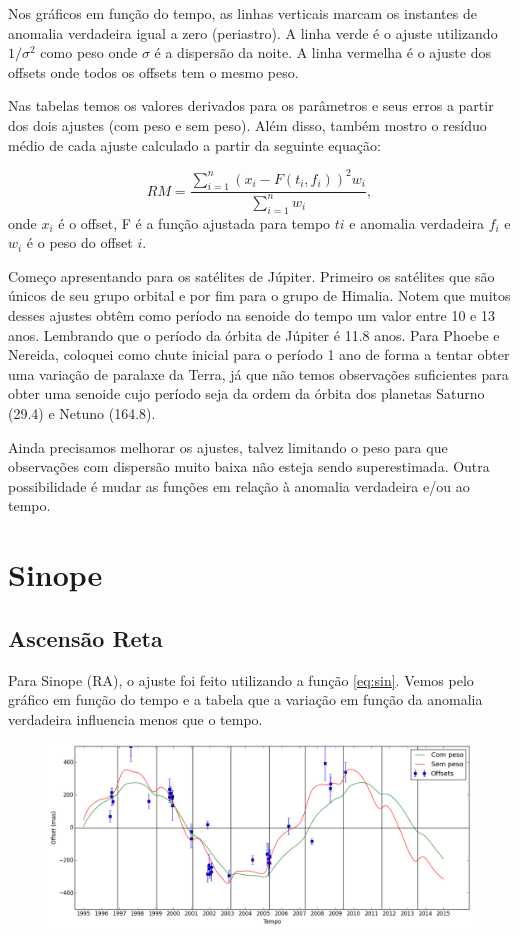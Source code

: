 \documentclass[11pt,a4paper]{report}
\begin{document}
Nos gráficos em função do tempo, as linhas verticais marcam os instantes de anomalia verdadeira igual a zero (periastro). A linha verde é o ajuste utilizando $1 / \sigma^{2}$ como peso onde $\sigma$ é a dispersão da noite. A linha vermelha é o ajuste dos offsets onde todos os offsets tem o mesmo peso.

Nas tabelas temos os valores derivados para os parâmetros e seus erros a partir dos dois ajustes (com peso e sem peso). Além disso, também mostro o resíduo médio de cada ajuste calculado a partir da seguinte equação:

\begin{equation}
RM = \frac{\sum\limits_{i=1}^{n}{(x_{i} - F(t_{i},f_{i}))^2}w_{i}}{\sum\limits_{i=1}^{n}{w}_{i}},
\end{equation}
onde $x_{i}$ é o offset, F é a função ajustada para tempo $t{i}$ e anomalia verdadeira $f_{i}$ e $w_{i}$ é o peso do offset $i$.

Começo apresentando para os satélites de Júpiter. Primeiro os satélites que são únicos de seu grupo orbital e por fim para o grupo de Himalia. Notem que muitos desses ajustes obtêm como período na senoide do tempo um valor entre 10 e 13 anos. Lembrando que o período da órbita de Júpiter é 11.8 anos. Para Phoebe e Nereida, coloquei como chute inicial para o período 1 ano de forma a tentar obter uma variação de paralaxe da Terra, já que não temos observações suficientes para obter uma senoide cujo período seja da ordem da órbita dos planetas Saturno (29.4) e Netuno (164.8).

Ainda precisamos melhorar os ajustes, talvez limitando o peso para que observações com dispersão muito baixa não esteja sendo superestimada. Outra possibilidade é mudar as funções em relação à anomalia verdadeira e/ou ao tempo.


\chapter*{Sinope}
\section*{Ascensão Reta}

\indent \indent Para Sinope (RA), o ajuste foi feito utilizando a função \ref{eq:sin}. Vemos pelo gráfico em função do tempo e a tabela que a variação em função da anomalia verdadeira influencia menos que o tempo.\\

\begin{figure}[h]
\includegraphics[scale=0.45]{Sinope/RA.png} 
\end{figure}
\end{document}
